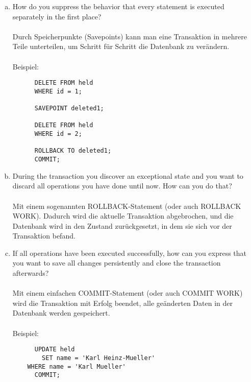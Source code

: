 \documentclass[11pt,a4paper,DIV=9]{scrartcl}
\begin{document}
      \begin{enumerate}[a.]
      \item How do you suppress the behavior that every statement is executed separately in the first place? \\\\
      Durch Speicherpunkte (Savepoints) kann man eine Transaktion in mehrere Teile unterteilen, um Schritt f\"ur Schritt die Datenbank zu ver\"andern. \\\\
      Beispiel:
      \begin{lstlisting}
      DELETE FROM held
      WHERE id = 1;
      
      SAVEPOINT deleted1;
      
      DELETE FROM held
      WHERE id = 2;
      
      ROLLBACK TO deleted1;
      COMMIT;
      \end{lstlisting}
      \item During the transaction you discover an exceptional state and you want to discard all operations you have done until now. How can you do that? \\\\
      Mit einem sogenannten ROLLBACK-Statement (oder auch ROLLBACK WORK). Dadurch wird die aktuelle Transaktion abgebrochen, und die Datenbank wird in den Zustand zur\"uckgesetzt, in dem sie sich vor der Transaktion befand.     
      \item If all operations have been executed successfully, how can you express that you want to save all changes persistently and close the transaction afterwards? \\\\
      Mit einem einfachen COMMIT-Statement (oder auch COMMIT WORK) wird die Transaktion mit Erfolg beendet, alle ge\"anderten Daten in der Datenbank werden gespeichert. \\\\
      Beispiel:
      \begin{lstlisting}
      UPDATE held
      	SET name = 'Karl Heinz-Mueller'
	WHERE name = 'Karl Mueller'
      COMMIT;
      \end{lstlisting}
      \end{enumerate}
\end{document}
